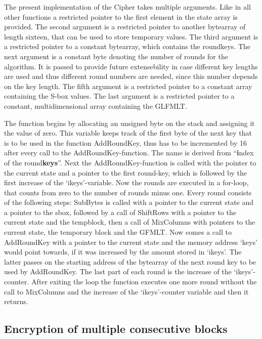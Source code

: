 The present implementation of the Cipher takes multiple arguments. Like
in all other functions a restricted pointer to the first element in the
state array is provided. The second argument is a restricted pointer to
another bytearray of length sixteen, that can be used to store temporary
values. The third argument is a restricted pointer to a constant
bytearray, which contains the roundkeys. The next argument is a constant
byte denoting the number of rounds for the algorithm. It is passed to
provide future extensebility in case different key lengths are used and
thus different round numbers are needed, since this number depends on
the key length. The fifth argument is a restricted pointer to a constant
array containing the S-box values. The last argument is a restricted
pointer to a constant, multidimensional array containing the GLFMLT.

The function begins by allocating an unsigned byte on the stack and
assigning it the value of zero. This variable keeps track of the first
byte of the next key that is to be used in the function AddRoundKey,
thus has to be incremented by 16 after every call to the
AddRoundKey-function. The name is derived from ``\textbf{i}ndex of the
round\textbf{keys}''. Next the AddRoundKey-function is called with the
pointer to the current state and a pointer to the first round-key, which
is followed by the first increase of the `ikeys'-variable. Now the
rounds are executed in a for-loop, that counts from zero to the number
of rounds minus one. Every round consists of the following steps:
SubBytes is called with a pointer to the current state and a pointer to
the sbox, followed by a call of ShiftRows with a pointer to the current
state and the tempblock, then a call of MixColumns with pointers to the
current state, the temporary block and the GFMLT. Now comes a call to
AddRoundKey with a pointer to the current state and the memory address
`keys' would point towards, if it was increased by the amount stored in
`ikeys'. The latter passes on the starting address of the bytearray of
the next round key to be used by AddRoundKey. The last part of each
round is the increase of the `ikeys'-counter. After exiting the loop the
function executes one more round without the call to MixColumns and the
increase of the `ikeys'-counter variable and then it returns.

\hypertarget{encryption-of-multiple-consecutive-blocks}{%
\subsection{Encryption of multiple consecutive
blocks}\label{encryption-of-multiple-consecutive-blocks}}

